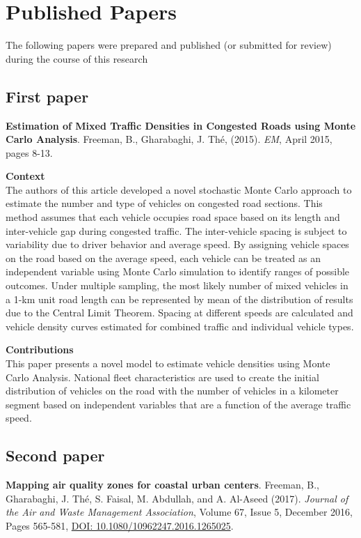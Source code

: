 
\chapter{Published Papers}

The following papers were prepared and published (or submitted for review) during the course of this research

\section{First paper}
\noindent
\textbf{Estimation of Mixed Traffic Densities in Congested Roads using Monte Carlo Analysis}. Freeman, B., Gharabaghi, J.  Th\'e, (2015). \textit{EM}, April 2015, pages 8-13. 

\vspace{5mm}
\noindent
\textbf{Context}\\
\noindent
The authors of this article developed a novel stochastic Monte Carlo approach to estimate the number and type of vehicles on congested road sections. This method assumes that each vehicle occupies road space based on its length and inter-vehicle gap during congested traffic. The inter-vehicle spacing is subject to variability due to driver behavior and average speed. By assigning vehicle spaces on the road based on the average speed, each vehicle can be treated as an independent variable using Monte Carlo simulation to identify ranges of possible outcomes. Under multiple sampling, the most likely number of mixed vehicles in a 1-km unit road length can be represented by mean of the distribution of results due to the Central Limit Theorem. Spacing at different speeds are calculated and vehicle density curves estimated for combined traffic and individual vehicle types.

\vspace{5mm}
\noindent
\textbf{Contributions}\\
\noindent
This paper presents a novel model to estimate vehicle densities using Monte Carlo Analysis. National fleet characteristics are used to create the initial distribution of vehicles on the road with the number of vehicles in a kilometer segment based on independent variables that are a function of the average traffic speed. 

\noindent
\section{Second paper}
\noindent
\textbf{Mapping air quality zones for coastal urban centers}. Freeman, B., Gharabaghi, J.  Th\'e, S. Faisal, M. Abdullah, and A. Al-Aseed (2017). \textit{Journal of the Air and Waste Management Association}, Volume 67, Issue 5, December 2016, Pages 565-581, \url{ DOI: 10.1080/10962247.2016.1265025}.

